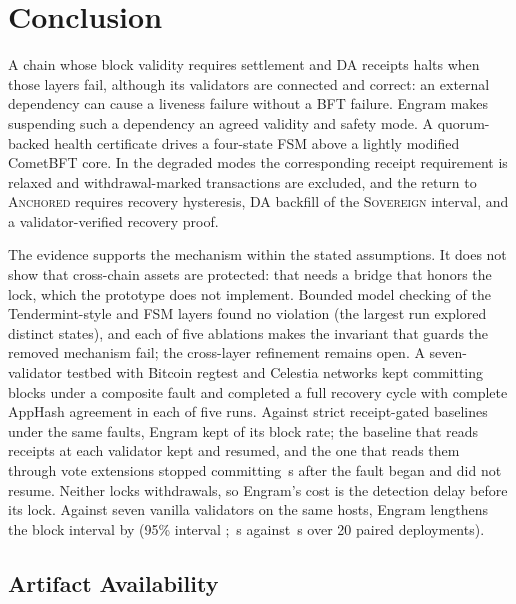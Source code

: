 \section{Conclusion}
\label{sec:conclusion}

A chain whose block validity requires settlement and DA receipts halts when
those layers fail, although its validators are connected and correct: an
external dependency can cause a liveness failure without a BFT failure.
Engram makes suspending such a dependency an agreed validity and safety mode.
A quorum-backed health certificate drives a four-state FSM above a lightly modified
CometBFT core. In the degraded modes the corresponding receipt
requirement is relaxed and withdrawal-marked transactions are excluded, and the return
to \textsc{Anchored} requires recovery hysteresis, DA backfill of the
\textsc{Sovereign} interval, and a validator-verified recovery proof.

The evidence supports the mechanism within the stated assumptions. It does not show that cross-chain assets are protected: that needs a bridge that honors the lock, which the prototype does not implement. Bounded
model checking of the Tendermint-style and FSM layers found no violation (the largest
run explored \resFSMStatesM{} distinct states), and each of five ablations makes the invariant that guards the removed mechanism fail; the cross-layer refinement remains open. A
seven-validator testbed with Bitcoin regtest and Celestia networks kept
committing blocks under a composite fault and completed a full recovery cycle
with complete AppHash agreement in each of five runs. Against strict
receipt-gated baselines under the same faults, Engram kept \resRQTwoEngram{} of its
block rate; the baseline that reads receipts at each validator kept \resRQTwoOob{} and resumed, and the
one that reads them through vote extensions stopped committing \resInBandHalt\,s after the fault began and
did not resume. Neither locks withdrawals, so Engram's cost is
the detection delay before its lock. Against seven vanilla validators on the same
hosts, Engram lengthens the block interval by \resOverheadPct{} (95\% interval \resOverheadCI{};
\resPairedEngram\,s against \resPairedVanilla\,s over 20 paired deployments).

\subsection*{Artifact Availability}

